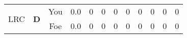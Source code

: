 \documentclass[a4paper,12pt]{article}
\begin{document}
\begin{tabular}[t]{| c | c | c | c | c | c | c | c | c | c | c | c
      |}
                      
      
        \hline
        \multirow{2}{*}{  LRC
             } &
              \multirow{2}{*}{  
                  \textbf{D}  } & 
                    \cellcolor{yellow!25} You & \cellcolor{yellow!25} 0.0 & \cellcolor{yellow!25} 0 &
                    \cellcolor{yellow!25} 0 & \cellcolor{yellow!25} 0 & \cellcolor{yellow!25} 0 &
                    \cellcolor{yellow!25} 0 & \cellcolor{yellow!25} 0 & \cellcolor{yellow!25} 0 &
                    \cellcolor{yellow!25} 0 \\
                    \cline{3-12}
                    & & \cellcolor{red!15} Foe & \cellcolor{red!15} 0.0 & \cellcolor{red!15} 0 & \cellcolor{red!15}
                    0 & \cellcolor{red!15} 0
                    & \cellcolor{red!15} 0 & \cellcolor{red!15}
                    0 & \cellcolor{red!15} 0 
                    & \cellcolor{red!15} 0 & \cellcolor{red!15}
                    0 \\
                    
                      
                        \hline
                      \end{tabular}
                      
\end{document}
